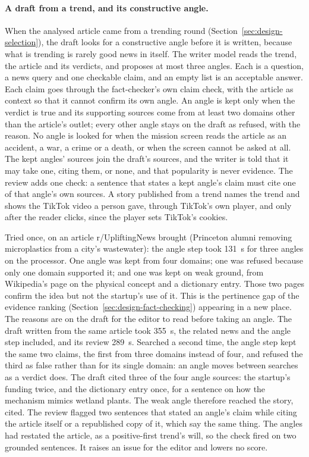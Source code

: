 \paragraph{A draft from a trend, and its constructive angle.} When the
analysed article came from a trending round (Section~\ref{sec:design-selection}),
the draft looks for a constructive angle before it is written, because
what is trending is rarely good news in itself. The writer model reads
the trend, the article and its verdicts, and proposes at most three
angles. Each is a question, a news query and one checkable claim, and an
empty list is an acceptable answer. Each claim goes through the
fact-checker's own claim check, with the article as context so that it
cannot confirm its own angle. An angle is kept only when the verdict is
true and its supporting sources come from at least two domains other
than the article's outlet; every other angle stays on the draft as
refused, with the reason. No angle is looked for when the mission screen
reads the article as an accident, a war, a crime or a death, or when the
screen cannot be asked at all. The kept angles' sources join the draft's
sources, and the writer is told that it may take one, citing them, or
none, and that popularity is never evidence. The review adds one check:
a sentence that states a kept angle's claim must cite one of that
angle's own sources. A story published from a trend names the trend and
shows the TikTok video a person gave, through TikTok's own player, and
only after the reader clicks, since the player sets TikTok's cookies.

Tried once, on an article r/UpliftingNews brought (Princeton alumni
removing microplastics from a city's wastewater): the angle step took
131~s for three angles on the processor. One angle was kept from four
domains; one was refused because only one domain supported it; and one
was kept on weak ground, from Wikipedia's page on the physical concept
and a dictionary entry. Those two pages confirm the idea but not the
startup's use of it. This is the pertinence gap of the evidence ranking
(Section~\ref{sec:design-fact-checking}) appearing in a new place. The
reasons are on the draft for the editor to read before taking an angle.
The draft written from the same article took 355~s, the related news and
the angle step included, and its review 289~s. Searched a second time,
the angle step kept the same two claims, the first from three domains
instead of four, and refused the third as false rather than for its
single domain: an angle moves between searches as a verdict does. The
draft cited three of the four
angle sources: the startup's funding twice, and the dictionary entry once,
for a sentence on how the mechanism mimics wetland plants. The weak angle
therefore reached the story, cited. The review flagged two sentences that
stated an angle's claim while citing the article itself or a republished
copy of it, which say the same thing. The angles had restated the
article, as a positive-first trend's will, so the check fired on two
grounded sentences. It raises an issue for the editor and lowers no score.
